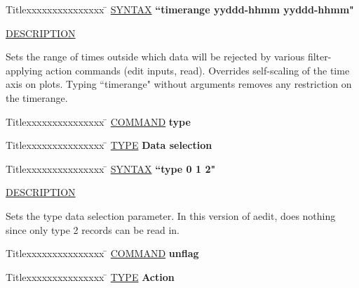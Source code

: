 \begin{tabbing}
Titlexxxxxxxxxxxxxxx \= \kill
\underline{SYNTAX} \> {\bf 		``timerange yyddd-hhmm yyddd-hhmm"} \\
\end{tabbing}

\underline{DESCRIPTION}
\begin{list}{}{\setlength{\leftmargin}{0.5in}
     \setlength{\rightmargin}{0in}}
\item
Sets the range of times outside which data will be rejected by
various filter-applying action commands (edit inputs, read).
Overrides self-scaling of the time axis on plots.  Typing
``timerange" without arguments removes any restriction on the
timerange.
\end{list}
\vspace{.2in}

\begin{tabbing}
Titlexxxxxxxxxxxxxxx \= \kill
\underline{COMMAND} \> {\bf 	type} \\
\end{tabbing}

\begin{tabbing}
Titlexxxxxxxxxxxxxxx \= \kill
\underline{TYPE} \> {\bf 		Data selection} \\
\end{tabbing}

\begin{tabbing}
Titlexxxxxxxxxxxxxxx \= \kill
\underline{SYNTAX} \> {\bf 		``type 0 1 2"} \\
\end{tabbing}

\underline{DESCRIPTION}
\begin{list}{}{\setlength{\leftmargin}{0.5in}
     \setlength{\rightmargin}{0in}}
\item
Sets the type data selection parameter.  In this version of
aedit, does nothing since only type 2 records can be read in.
\end{list}
\vspace{.2in}

\begin{tabbing}
Titlexxxxxxxxxxxxxxx \= \kill
\underline{COMMAND} \> {\bf 	unflag} \\
\end{tabbing}

\begin{tabbing}
Titlexxxxxxxxxxxxxxx \= \kill
\underline{TYPE} \> {\bf 		Action} \\
\end{tabbing}

